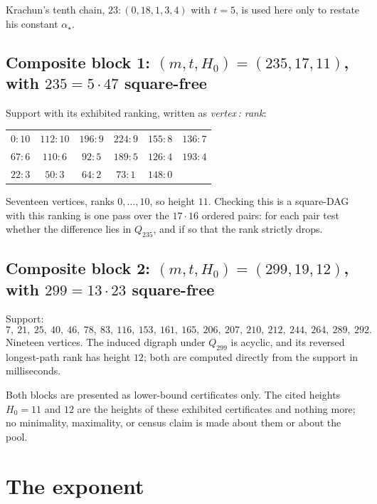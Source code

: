 \documentclass[11pt]{amsart}
\theoremstyle{plain}
\theoremstyle{remark}
\begin{document}
Krachun's tenth chain, $23 : (0, 18, 1, 3, 4)$ with $t = 5$, is used here
only to restate his constant $\alpha_\star$.

\subsection{Composite block 1:
\texorpdfstring{$(m, t, H_0) = (235, 17, 11)$, with $235 = 5 \cdot 47$
square-free}{(m, t, H0) = (235, 17, 11), with 235 = 5.47 square-free}}

Support with its exhibited ranking, written as \emph{vertex\,: rank}:

\begin{center}
\begin{tabular}{cccccc}
$0 : 10$ & $112 : 10$ & $196 : 9$ & $224 : 9$ & $155 : 8$ & $136 : 7$ \\
$67 : 6$ & $110 : 6$  & $92 : 5$  & $189 : 5$ & $126 : 4$ & $193 : 4$ \\
$22 : 3$ & $50 : 3$   & $64 : 2$  & $73 : 1$  & $148 : 0$ & \\
\end{tabular}
\end{center}

Seventeen vertices, ranks $0,\dots,10$, so height $11$. Checking this is a
square-DAG with this ranking is one pass over the $17 \cdot 16$ ordered
pairs: for each pair test whether the difference lies in $Q_{235}$, and if
so that the rank strictly drops.

\subsection{Composite block 2:
\texorpdfstring{$(m, t, H_0) = (299, 19, 12)$, with $299 = 13 \cdot 23$
square-free}{(m, t, H0) = (299, 19, 12), with 299 = 13.23 square-free}}

Support:
\[
7,\ 21,\ 25,\ 40,\ 46,\ 78,\ 83,\ 116,\ 153,\ 161,\ 165,\ 206,\ 207,\ 210,\
212,\ 244,\ 264,\ 289,\ 292.
\]
Nineteen vertices. The induced digraph under $Q_{299}$ is acyclic, and its
reversed longest-path rank has height $12$; both are computed directly from
the support in milliseconds.

Both blocks are presented as lower-bound certificates only. The cited
heights $H_0 = 11$ and $12$ are the heights of these exhibited certificates
and nothing more; no minimality, maximality, or census claim is made about
them or about the pool.

\section{The exponent}\label{sec:exponent}
\end{document}
